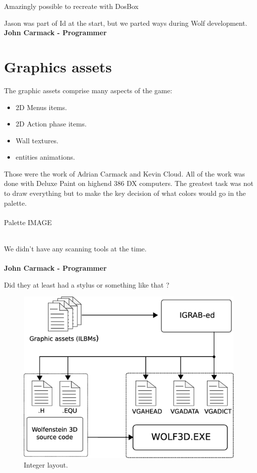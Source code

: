 \documentclass[book.tex]{subfiles}
\begin{document}
Amazingly possible to recreate with DosBox


\begin{fancyquotes}
Jason was part of Id at the start, but we parted ways during Wolf development.
 \bigskip \\
\textbf{John Carmack - Programmer}
 \end{fancyquotes}
 
 
 
\section{Graphics assets}
The graphic assets comprise many aspects of the game:
\begin{itemize}
\item 2D Menus items.
\item 2D Action phase items.
\item Wall textures.
\item entities animations.
\end{itemize}
Those were the work of Adrian Carmack and Kevin Cloud. All of the work was done with Deluxe Paint on highend 386 DX computers. The greatest task was not to draw everything but to make the key decision of what colors would go in the palette.\\
\\
Palette IMAGE\\
\\
\begin{fancyquotes}
We didn't have any scanning tools at the time.\\
\\
\textbf{John Carmack - Programmer}
\end{fancyquotes}
Did they at least had a stylus or something like that ?	\\
\begin{figure}[H]
\centering
 \includegraphics[scale=0.4]{imgs/drawing_plain.eps}
 \caption{Integer layout.} \label{fig:mips}
 \end{figure}
\end{document}
